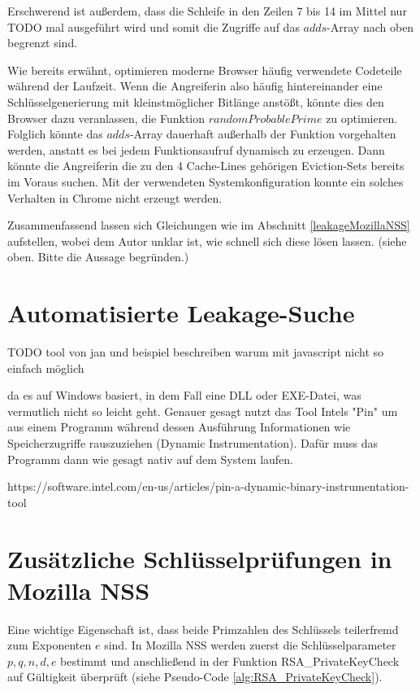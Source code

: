 Erschwerend ist außerdem, dass die Schleife in den Zeilen 7 bis 14 im Mittel nur TODO mal ausgeführt wird und somit die Zugriffe auf das $adds$-Array nach oben begrenzt sind.

Wie bereits erwähnt, optimieren moderne Browser häufig verwendete Codeteile während der Laufzeit.
Wenn die Angreiferin also häufig hintereinander eine Schlüsselgenerierung mit kleinstmöglicher Bitlänge anstößt, könnte dies den Browser dazu veranlassen, die Funktion $randomProbablePrime$ zu optimieren. 
Folglich könnte das $adds$-Array dauerhaft außerhalb der Funktion vorgehalten werden, anstatt es bei jedem Funktionsaufruf dynamisch zu erzeugen.
Dann könnte die Angreiferin die zu den 4 Cache-Lines gehörigen Eviction-Sets bereits im Voraus suchen.
Mit der verwendeten Systemkonfiguration konnte ein solches Verhalten in Chrome nicht erzeugt werden.

Zusammenfassend lassen sich Gleichungen wie im Abschnitt \ref{leakageMozillaNSS} aufstellen, wobei dem Autor unklar ist, wie schnell sich diese lösen lassen. (siehe oben. Bitte die Aussage begründen.)

\section{Automatisierte Leakage-Suche}

TODO tool von jan und beispiel beschreiben
warum mit javascript nicht so einfach möglich

 da es auf Windows basiert, in dem Fall eine DLL
oder EXE-Datei, was vermutlich nicht so leicht geht. Genauer gesagt
nutzt das Tool Intels "Pin" um aus einem Programm während dessen
Ausführung Informationen wie Speicherzugriffe rauszuziehen (Dynamic
Instrumentation). Dafür muss das Programm dann wie gesagt nativ auf dem
System laufen.

https://software.intel.com/en-us/articles/pin-a-dynamic-binary-instrumentation-tool


\section{Zusätzliche Schlüsselprüfungen in Mozilla NSS}
\label{RSAGenGCDAttack}

Eine wichtige Eigenschaft ist, dass beide Primzahlen des Schlüssels teilerfremd zum Exponenten $e$ sind.
In Mozilla NSS werden zuerst die Schlüsselparameter $p,q,n,d,e$ bestimmt und anschließend in der Funktion RSA_PrivateKeyCheck auf Gültigkeit überprüft (siehe Pseudo-Code \ref{alg:RSA_PrivateKeyCheck}).

